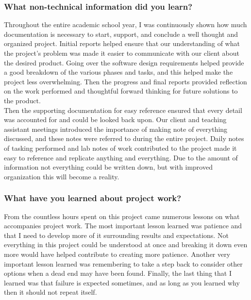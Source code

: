 \subsubsection{What non-technical information did you learn?}

Throughout the entire academic school year, I was continuously shown how much 
documentation is necessary to start, support, and conclude a well thought and 
organized project. Initial reports helped ensure that our understanding of what 
the project's problem was made it easier to communicate with our client about 
the desired product. Going over the software design requirements helped provide 
a good breakdown of the various phases and tasks, and this helped make the 
project less overwhelming. Then the progress and final reports provided reflection on
the work performed and thoughtful forward thinking for future solutions to the 
product.  \\

Then the supporting documentation for easy reference ensured that every detail 
was accounted for and could be looked back upon. Our client and teaching assistant 
meetings introduced the importance 
of making note of everything discussed, and these notes were referred to during the 
entire project. Daily notes of tasking performed and lab notes of work contributed to 
the project made it easy to reference and replicate anything and everything. 
Due to the amount of information not everything could 
be written down, but with improved organization this will become a reality.  \\

\subsubsection{What have you learned about project work?}

From the countless hours spent on this project came numerous lessons on what accompanies 
project work. The most important lesson learned was patience and that I need to 
develop more of it surrounding results and expectations. Not everything in this project 
could be understood at once and breaking it down even more would have helped contribute 
to creating more patience. Another very important lesson learned was remembering to 
take a step back to consider other options when a dead end may have been found. Finally, 
the last thing that I learned was that failure is expected sometimes, and as long as you 
learned why then it should not repeat itself.  \\

